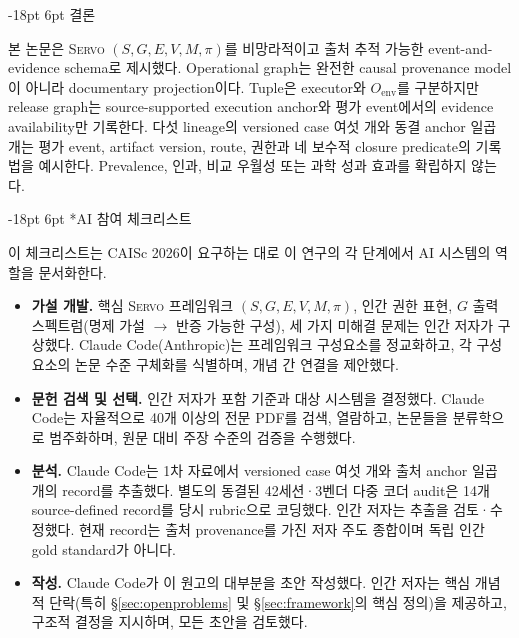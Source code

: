 \documentclass[11pt]{article}
\makeatletter
\renewcommand\section{\@startsection{section}{1}{\z@}%
  {-18pt \@plus -4pt \@minus -2pt}%
  {6pt \@plus 2pt}%
  {\normalfont\large\bfseries}}
\newcommand{\sgmvpi}{$(S, G, E, V, M, \pi)$}
\newcommand{\framework}{\textsc{Servo}}
\makeatother
\begin{document}
\section{결론}
\label{sec:conclusion}

본 논문은 \framework{} \sgmvpi{}를 비망라적이고 출처 추적 가능한 event-and-evidence schema로 제시했다. Operational graph는 완전한 causal provenance model이 아니라 documentary projection이다. Tuple은 executor와 $O_{\mathrm{env}}$를 구분하지만 release graph는 source-supported execution anchor와 평가 event에서의 evidence availability만 기록한다. 다섯 lineage의 versioned case 여섯 개와 동결 anchor 일곱 개는 평가 event, artifact version, route, 권한과 네 보수적 closure predicate의 기록법을 예시한다. Prevalence, 인과, 비교 우월성 또는 과학 성과 효과를 확립하지 않는다.




\newpage
\section*{AI 참여 체크리스트}
\label{sec:ai-checklist}

이 체크리스트는 CAISc 2026이 요구하는 대로 이 연구의 각 단계에서 AI 시스템의 역할을 문서화한다.

\begin{itemize}
  \item \textbf{가설 개발.} 핵심 \framework{} 프레임워크 \sgmvpi{}, 인간 권한 표현, $G$ 출력 스펙트럼(명제 가설 $\to$ 반증 가능한 구성), 세 가지 미해결 문제는 인간 저자가 구상했다. Claude Code(Anthropic)는 프레임워크 구성요소를 정교화하고, 각 구성요소의 논문 수준 구체화를 식별하며, 개념 간 연결을 제안했다.

  \item \textbf{문헌 검색 및 선택.} 인간 저자가 포함 기준과 대상 시스템을 결정했다. Claude Code는 자율적으로 40개 이상의 전문 PDF를 검색, 열람하고, 논문들을 분류학으로 범주화하며, 원문 대비 주장 수준의 검증을 수행했다.

  \item \textbf{분석.} Claude Code는 1차 자료에서 versioned case 여섯 개와 출처 anchor 일곱 개의 record를 추출했다. 별도의 동결된 42세션·3벤더 다중 코더 audit은 14개 source-defined record를 당시 rubric으로 코딩했다. 인간 저자는 추출을 검토·수정했다. 현재 record는 출처 provenance를 가진 저자 주도 종합이며 독립 인간 gold standard가 아니다.

  \item \textbf{작성.} Claude Code가 이 원고의 대부분을 초안 작성했다. 인간 저자는 핵심 개념적 단락(특히 §\ref{sec:openproblems} 및 §\ref{sec:framework}의 핵심 정의)을 제공하고, 구조적 결정을 지시하며, 모든 초안을 검토했다.
\end{itemize}
\end{document}
